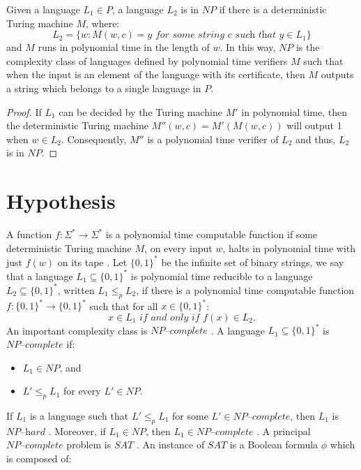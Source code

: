 \documentclass[a4paper,UKenglish,cleveref, autoref]{lipics-v2019}
\begin{document}
\begin{lemma}
\label{verifier}
Given a language $L_{1} \in P$, a language $L_{2}$ is in $NP$ if there is a deterministic Turing machine $M$, where:
\[L_{2} = \{w: M(w, c) = y \textit{ for some string } c \textit{ such that } y \in L_{1}\}\]
and $M$ runs in polynomial time in the length of $w$. In this way, $NP$ is the complexity class of languages defined by polynomial time verifiers $M$ such that when the input is an element of the language with its certificate, then $M$ outputs a string which belongs to a single language in $P$.
\end{lemma}

\begin{proof}
If $L_{1}$ can be decided by the Turing machine $M'$ in polynomial time, then the deterministic Turing machine $M''(w, c) = M'(M(w, c))$ will output 1 when $w \in L_{2}$. Consequently, $M''$ is a polynomial time verifier of $L_{2}$ and thus, $L_{2}$ is in $NP$.
\end{proof}

\section{Hypothesis}

A function $f : \Sigma^{*} \rightarrow \Sigma^{*}$ is a polynomial time computable function if some deterministic Turing machine $M$, on every input $w$, halts in polynomial time with just $f(w)$ on its tape \cite{MS06}. Let $\{0, 1\}^{*}$ be the infinite set of binary strings, we say that a language $L_{1} \subseteq \{0, 1\}^{*}$ is polynomial time reducible to a language $L_{2} \subseteq \{0, 1\}^{*}$, written $L_{1} \leq_{p} L_{2}$, if there is a polynomial time computable function $f : \{0, 1\}^{*} \rightarrow \{0, 1\}^{*}$ such that for all $x \in \{0, 1\}^{*}$:
\[x \in L_{1} \textit{ if and only if } f(x) \in L_{2}.\]
An important complexity class is $\textit{NP--complete}$ \cite{OG10}. A language $L_{1} \subseteq \{0, 1\}^{*}$ is $\textit{NP--complete}$ if:

\begin{itemize}
\item $L_{1} \in NP$, and
\item $L' \leq_{p} L_{1}$ for every $L' \in NP$.
\end{itemize}

If $L_{1}$ is a language such that $L' \leq_{p} L_{1}$ for some $L' \in \textit{NP--complete}$, then $L_{1}$ is $\textit{NP--hard}$ \cite{CLRS01}. Moreover, if $L_{1} \in NP$, then $L_{1} \in \textit{NP--complete}$ \cite{CLRS01}. A principal $\textit{NP--complete}$ problem is $SAT$ \cite{GJ79}. An instance of $SAT$ is a Boolean formula $\phi$ which is composed of:
\end{document}
